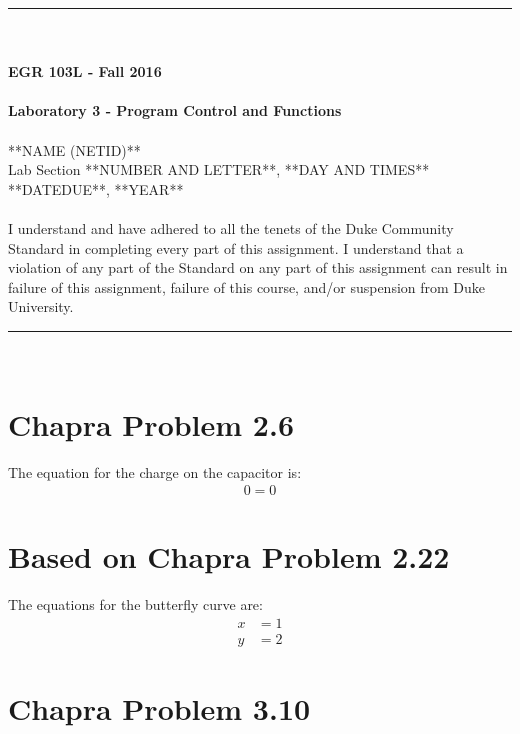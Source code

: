 \documentclass{article}
\begin{document}
\begin{center}
\rule{6.5in}{0.5mm}\\~\\
{\bf \large EGR 103L - Fall 2016}\\~\\
{\huge \bf Laboratory 3 - Program Control and Functions}\\~\\
**NAME (NETID)**\\
Lab Section **NUMBER AND LETTER**, **DAY AND TIMES**\\
**DATEDUE**, **YEAR**\\~\\
{\small I understand and have adhered to all the tenets of the Duke
  Community Standard in completing every part of this assignment.  I
  understand that a violation of any part of the Standard on any part
  of this assignment can result in failure of this assignment, failure
  of this course, and/or suspension from Duke University.} 
\rule{6.5in}{0.5mm}\\
\end{center}
\tableofcontents
\listoffigures
\pagebreak

\section{Chapra Problem 2.6}
The equation for the charge on the capacitor\cite[p.~44]{Chapra} is:
\begin{align*}
0=0
\end{align*}

\section{Based on Chapra Problem 2.22}
The equations for the butterfly curve\cite[p.~47]{Chapra} are:
\begin{align*}
x &= 1\\
y &= 2
\end{align*}

\section{Chapra Problem 3.10}
\end{document}
